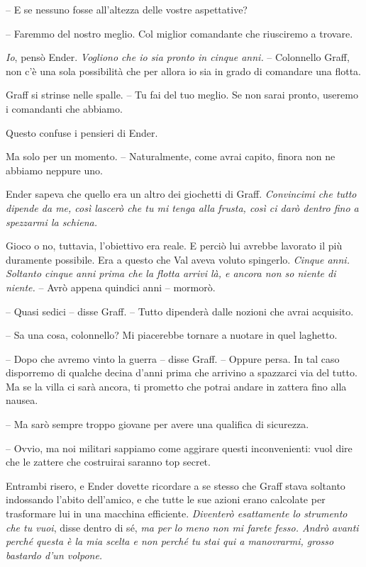 {-- E se nessuno fosse all'altezza delle vostre aspettative?}

{-- Faremmo del nostro meglio. Col miglior comandante che riusciremo a
	trovare.}

\emph{{Io}}{, \emph{} pensò Ender. \emph{Vogliono che io sia pronto in
		cinque anni.} -- Colonnello Graff, non c'è una sola possibilità che per
	allora io sia in grado di comandare una flotta.}

{Graff si strinse nelle spalle. -- Tu fai del tuo meglio. Se non sarai
	pronto, useremo i comandanti che abbiamo.}

{Questo confuse i pensieri di Ender.}

{Ma solo per un momento. -- Naturalmente, come avrai capito, finora non
	ne abbiamo neppure uno.}

{Ender sapeva che quello era un altro dei giochetti di Graff.
	\emph{Convincimi che tutto dipende da me, così lascerò che tu mi tenga
		alla frusta, così ci darò dentro fino a spezzarmi la schiena.}}

{Gioco o no, tuttavia, l'obiettivo era reale. E perciò lui avrebbe
	lavorato il più duramente possibile. Era a questo che Val aveva voluto
	spingerlo. \emph{Cinque anni. Soltanto cinque anni prima che la flotta
		arrivi là, e ancora non so niente di niente.} -- Avrò appena quindici
	anni -- mormorò.}

{-- Quasi sedici -- disse Graff. -- Tutto dipenderà dalle nozioni che
	avrai acquisito.}

{-- Sa una cosa, colonnello? Mi piacerebbe tornare a nuotare in quel
	laghetto.}

{-- Dopo che avremo vinto la guerra -- disse Graff. -- Oppure persa. In
	tal caso disporremo di qualche decina d'anni prima che arrivino a
	spazzarci via del tutto. Ma se la villa ci sarà ancora, ti prometto che
	potrai andare in zattera fino alla nausea.}

{-- Ma sarò sempre troppo giovane per avere una qualifica di sicurezza.}

{-- Ovvio, ma noi militari sappiamo come aggirare questi inconvenienti:
	vuol dire che le zattere che costruirai saranno top secret.}

{Entrambi risero, e Ender dovette ricordare a se stesso che Graff stava
	soltanto indossando l'abito dell'amico, e che tutte le sue azioni erano
	calcolate per trasformare lui in una macchina efficiente.
	\emph{Diventerò esattamente lo strumento che tu vuoi}, \emph{} disse
	dentro di sé, \emph{ma per lo meno non mi farete fesso. Andrò avanti
		perché questa è la mia scelta e non perché tu stai qui a manovrarmi,
		grosso bastardo d'un volpone.}}

